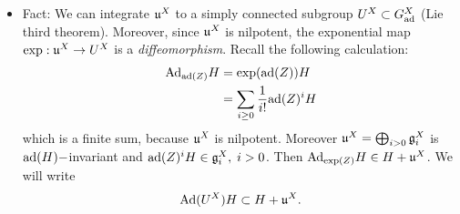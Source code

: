 \begin{itemize}
    \item Fact: We can integrate $\mathfrak{u}^X$ to a simply connected subgroup $U^X\subset G_{\text{ad}}^X$ (Lie third theorem). 
    Moreover, since $\mathfrak{u}^X$ is nilpotent, the exponential map $\exp:\mathfrak{u}^X\to U^X$ is a \textit{diffeomorphism}. 
    Recall the following calculation:
    \begin{equation}
        \begin{split}
             \text{Ad}_{\text{ad}(Z)}H&=\exp(\text{ad}(Z))H\\
              &=\sum_{i\geq0}\frac{1}{i!}\text{ad}(Z)^iH
        \end{split}
    \end{equation} 
    which is a finite sum, because $\mathfrak{u}^X$ is nilpotent. Moreover $\mathfrak{u}^X=\bigoplus_{i>0}\mathfrak{g}_i^X$ is 
    $\text{ad}(H)-$invariant and $\text{ad}(Z)^iH\in\mathfrak{g}_i^X,\;i>0$. Then $\text{Ad}_{\exp(Z)}H\in H+\mathfrak{u}^X$. We will write 
    \begin{equation}
        \text{Ad}(U^X)H\subset H+\mathfrak{u}^X.
    \end{equation}


\end{itemize}

